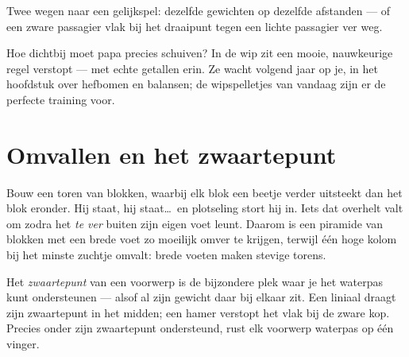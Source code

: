 \begin{omfigure}

{\small Twee wegen naar een gelijkspel: dezelfde gewichten op dezelfde
afstanden --- of een zware passagier vlak bij het draaipunt tegen een
lichte passagier ver weg.}
\end{omfigure}

\begin{remark}\label{rem:g2:balance-equilibrium:promise}
Hoe dichtbij moet papa precies schuiven? In de wip zit een mooie,
nauwkeurige regel verstopt --- met echte getallen erin. Ze wacht
volgend jaar op je, in het hoofdstuk over hefbomen en balansen; de
wipspelletjes van vandaag zijn er de perfecte training voor.
\end{remark}

\section{Omvallen en het zwaartepunt}

\begin{example}\label{ex:g2:balance-equilibrium:tower}
Bouw een toren van blokken, waarbij elk blok een beetje verder
uitsteekt dan het blok eronder. Hij staat, hij staat\dots\ en plotseling
stort hij in. Iets dat overhelt valt om zodra het \emph{te ver}
buiten zijn eigen voet leunt. Daarom is een piramide van blokken met
een brede voet zo moeilijk omver te krijgen, terwijl één hoge kolom
bij het minste zuchtje omvalt: brede voeten maken stevige torens.
\end{example}

\begin{definition}[Zwaartepunt]\label{def:g2:balance-equilibrium:point}
Het \emph{zwaartepunt} van een voorwerp is de
bijzondere plek waar je het waterpas kunt ondersteunen --- alsof al
zijn gewicht daar bij elkaar zit. Een liniaal draagt zijn zwaartepunt
in het midden; een hamer verstopt het vlak bij de zware kop. Precies
onder zijn zwaartepunt ondersteund, rust elk voorwerp waterpas op één
vinger.
\end{definition}

